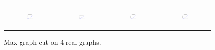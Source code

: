 \begin{figure}[ht]
\begin{tabular}{cccc}
	  \begin{subfigure}[b]{0.22\textwidth}
	  	\includegraphics[width=110pt]{images/validated_CC2G_friendster10M_maxgraphcut.eps}
			\caption{}
			\label{appfig:validated_CC2G_friendster10M_maxgraphcut}
	  \end{subfigure} &
	  \begin{subfigure}[b]{0.22\textwidth}
	  	\includegraphics[width=110pt]{images/validated_CC2G_arabic2005_maxgraphcut.eps}
			\caption{}
			\label{appfig:validated_CC2G_arabic2005_maxgraphcut}
	  \end{subfigure} &
	  \begin{subfigure}[b]{0.22\textwidth}
	  	\includegraphics[width=110pt]{images/validated_CC2G_uk2005_maxgraphcut.eps}
			\caption{}
			\label{appfig:validated_CC2G_uk2005_maxgraphcut}
	  \end{subfigure} &
	  \begin{subfigure}[b]{0.22\textwidth}
	  	\includegraphics[width=110pt]{images/validated_CC2G_it2004_maxgraphcut.eps}
			\caption{}
			\label{appfig:validated_CC2G_it2004_maxgraphcut}
	  \end{subfigure} \\
  \end{tabular}
  \caption{Max graph cut on 4 real graphs.}
\end{figure}





